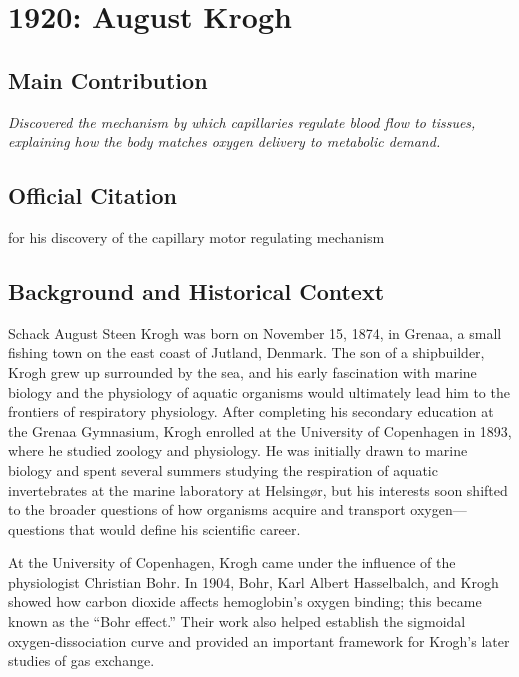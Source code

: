 \chapter[1920 --- Krogh]{1920: August Krogh}
\label{ch:1920_augustkrogh}

\section*{Main Contribution}

\textit{Discovered the mechanism by which capillaries regulate blood flow to tissues, explaining how the body matches oxygen delivery to metabolic demand.}\cite{nobel-1920,lecture-1920}

\section{Official Citation}

for his discovery of the capillary motor regulating mechanism

\section{Background and Historical Context}

Schack August Steen Krogh was born on November 15, 1874, in Grenaa, a small fishing town on the east coast of Jutland, Denmark. The son of a shipbuilder, Krogh grew up surrounded by the sea, and his early fascination with marine biology and the physiology of aquatic organisms would ultimately lead him to the frontiers of respiratory physiology. After completing his secondary education at the Grenaa Gymnasium, Krogh enrolled at the University of Copenhagen in 1893, where he studied zoology and physiology. He was initially drawn to marine biology and spent several summers studying the respiration of aquatic invertebrates at the marine laboratory at Helsing{\o}r, but his interests soon shifted to the broader questions of how organisms acquire and transport oxygen---questions that would define his scientific career.

At the University of Copenhagen, Krogh came under the influence of the physiologist Christian Bohr. In 1904, Bohr, Karl Albert Hasselbalch, and Krogh showed how carbon dioxide affects hemoglobin's oxygen binding; this became known as the ``Bohr effect.'' Their work also helped establish the sigmoidal oxygen-dissociation curve and provided an important framework for Krogh's later studies of gas exchange.\cite{krogh-bohr}

